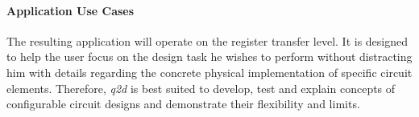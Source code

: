 	\paragraph{Application Use Cases}
	The resulting application will operate on the register transfer level.
	It is designed to help the user focus on the design task he wishes to perform without distracting him with details regarding the concrete physical implementation of specific circuit elements.
	Therefore, \emph{q2d} is best suited to develop, test and explain concepts of configurable circuit designs and demonstrate their flexibility and limits.